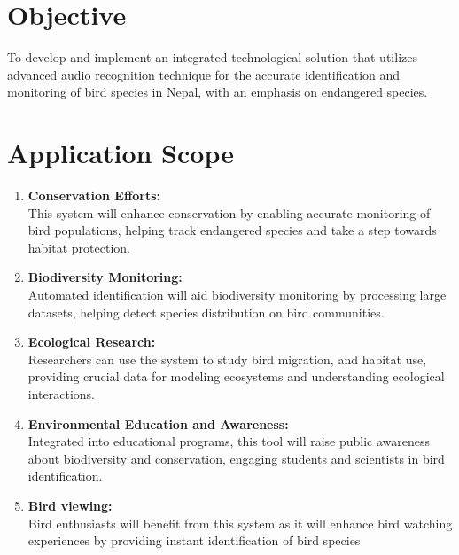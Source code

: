 \section{Objective}
\begin{enumerate}[label=\roman*]
    To develop and implement an integrated technological solution that utilizes
          advanced audio recognition technique for the accurate identification and
          monitoring of bird species in Nepal, with an emphasis on endangered species.
\end{enumerate}

\section{Application Scope}
\begin{enumerate}
    \item \textbf{Conservation Efforts:}\\This system will enhance conservation
          by enabling accurate monitoring
          of bird populations, helping track endangered species and take a step
          towards habitat protection.
    \item \textbf{Biodiversity Monitoring:}\\Automated identification will aid
          biodiversity monitoring by
          processing large datasets, helping detect species distribution on
          bird communities.
    \item \textbf{Ecological Research:}\\ Researchers can use the system to
          study bird migration,
          and habitat use, providing crucial data for modeling ecosystems and
          understanding ecological interactions.
    \item \textbf{Environmental Education and Awareness:}\\Integrated into
          educational programs, this tool will
          raise public awareness about biodiversity and conservation, engaging
          students and scientists in bird identification.
    \item \textbf{Bird viewing:}\\Bird enthusiasts will benefit from this
          system as it will enhance bird watching
          experiences by providing instant identification of bird species
\end{enumerate}
